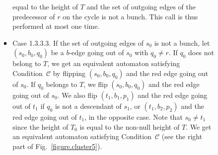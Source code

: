 \documentclass[11pt,a4paper]{article}
\def\C{\mathscr{C}}
\def\T{{T}}
\begin{document}
\begin{itemize}
\begin{itemize}
\begin{itemize}
\begin{itemize}
  equal to the height of $\T$ and the set of outgoing edges of the
  predecessor of $r$ on the cycle is not a bunch. This call is thus
  performed at most one time.
\item Case 1.3.3.3.
If the set of outgoing edges of $s_0$ is not a bunch, let
$(s_0,b_0,q_0)$ be a $b$-edge going out of $s_0$ with $q_0 \neq r$.
If $q_0$ does not belong to $\T$, we get an equivalent automaton
satisfying Condition~$\C$ by flipping $(s_0,b_0,q_0)$ and the red edge
going out of $s_0$. If $q_0$ belongs to $\T$, we flip $(s_0,b_0,q_0)$
and the red edge going out of $s_0$. We also flip $(t_1,b_1,p_1)$ and
the red edge going out of $t_1$ if $q_0$ is not a descendant of $s_1$,
or $(t_1,b_2,p_2)$ and the red edge going out of $t_1$, in the opposite
case. Note that $s_0 \neq t_1$ since the height of $\T_0$ is equal to
the non-null height of $\T$. We get an equivalent automaton satisfying
Condition~$\C$ (see the right part of Fig.~\ref{figure.cluster5}).
\end{itemize}
\end{itemize}
\end{itemize}



\begin{figure}[htbp]
    \centering
{}
\end{figure}
\end{itemize}
\end{document}
